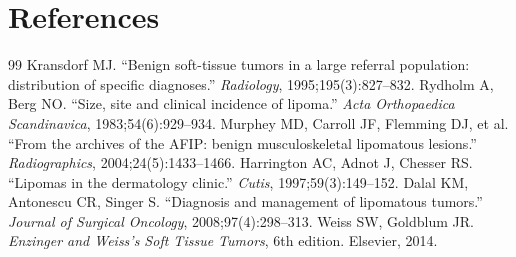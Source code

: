 \section*{References}
\begin{thebibliography}{99}
 Kransdorf MJ. ``Benign soft-tissue tumors in a large referral population: distribution of specific diagnoses.'' \textit{Radiology}, 1995;195(3):827--832.
 Rydholm A, Berg NO. ``Size, site and clinical incidence of lipoma.'' \textit{Acta Orthopaedica Scandinavica}, 1983;54(6):929--934.
 Murphey MD, Carroll JF, Flemming DJ, et al. ``From the archives of the AFIP: benign musculoskeletal lipomatous lesions.'' \textit{Radiographics}, 2004;24(5):1433--1466.
 Harrington AC, Adnot J, Chesser RS. ``Lipomas in the dermatology clinic.'' \textit{Cutis}, 1997;59(3):149--152.
 Dalal KM, Antonescu CR, Singer S. ``Diagnosis and management of lipomatous tumors.'' \textit{Journal of Surgical Oncology}, 2008;97(4):298--313.
 Weiss SW, Goldblum JR. \textit{Enzinger and Weiss's Soft Tissue Tumors}, 6th edition. Elsevier, 2014.

\end{thebibliography}
